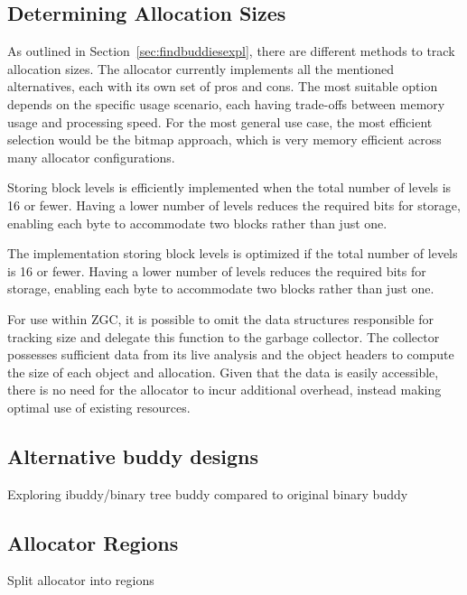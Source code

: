 \subsection{Determining Allocation Sizes}
As outlined in Section~\ref{sec:findbuddiesexpl}, there are different methods to track allocation sizes. The allocator currently implements all the mentioned alternatives, each with its own set of pros and cons. The most suitable option depends on the specific usage scenario, each having trade-offs between memory usage and processing speed. For the most general use case, the most efficient selection would be the bitmap approach, which is very memory efficient across many allocator configurations.

Storing block levels is efficiently implemented when the total number of levels is 16 or fewer. Having a lower number of levels reduces the required bits for storage, enabling each byte to accommodate two blocks rather than just one.

The implementation storing block levels is optimized if the total number of levels is 16 or fewer. Having a lower number of levels reduces the required bits for storage, enabling each byte to accommodate two blocks rather than just one.


For use within ZGC, it is possible to omit the data structures responsible for tracking size and delegate this function to the garbage collector. The collector possesses sufficient data from its live analysis and the object headers to compute the size of each object and allocation. Given that the data is easily accessible, there is no need for the allocator to incur additional overhead, instead making optimal use of existing resources.

\subsection{Alternative buddy designs}
Exploring ibuddy/binary tree buddy compared to original binary buddy


\subsection{Allocator Regions}
Split allocator into regions

